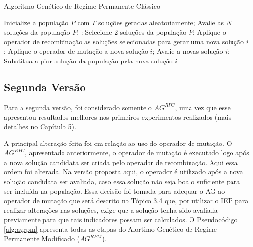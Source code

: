 \begin{algorithm}[H]
  \caption{Algoritmo Genético de Regime Permanente Clássico}
  \label{alg:agrpc}
  \begin{algorithmic}
    \State Inicialize a população $P$ com $T$ soluções geradas aleatoriamente;
    \State Avalie as $N$ soluções da população $P$;
       \State:
        \State Selecione 2 soluções da população $P$;
        \State Aplique o operador de recombinação as soluções selecionadas para gerar uma nova solução $i$;
        \State Aplique o operador de mutação a nova solução $i$;
        \State Avalie a novas solução $i$;
          \State Substitua a pior solução da população pela nova solução $i$	
        \EndIf
      \EndFor
    \EndWhile
  \end{algorithmic}
\end{algorithm}

\subsection{Segunda Versão}

Para a segunda versão, foi considerado somente o $AG^{RPC}$, uma vez que esse apresentou resultados melhores nos primeiros experimentos realizados (mais detalhes no Capítulo 5). 

A principal alteração feita foi em relação ao uso do operador de mutação. O $AG^{RPC}$, apresentado anteriormente, o operador de mutação é executado logo após a nova solução candidata ser criada pelo operador de recombinação. Aqui essa ordem foi alterada. Na versão proposta aqui, o operador é utilizado após a nova solução candidata ser avaliada, caso essa solução não seja boa o suficiente para ser incluída na população. Essa decisão foi tomada para adequar o AG ao operador de mutação que será descrito no Tópico 3.4 que, por utilizar o IEP para realizar alterações nas soluções, exige que a solução tenha sido avaliada previamente para que tais indicadores possam ser calculados. O Pseudocódigo \ref{alg:agrpm} apresenta todas as etapas do Alortimo Genético de Regime Permanente Modificado ($AG^{RPM}$).

